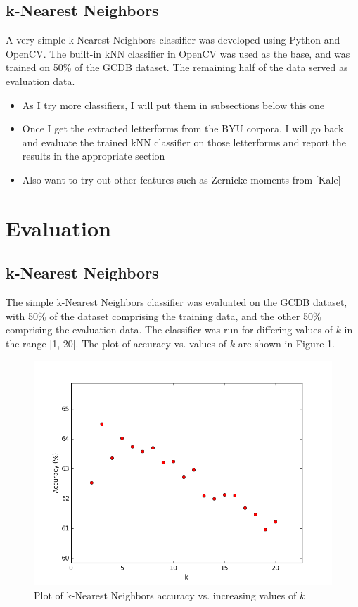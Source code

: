 \documentclass[10pt,twocolumn,letterpaper]{article}
\begin{document}
\subsection{k-Nearest Neighbors}

A very simple k-Nearest Neighbors classifier was developed using Python and OpenCV. The built-in kNN classifier in OpenCV was used as the base, and was trained on 50\% of the GCDB dataset. The remaining half of the data served as evaluation data.
\begin{itemize}
    \item As I try more classifiers, I will put them in subsections below this one
    \item Once I get the extracted letterforms from the BYU corpora, I will go back and evaluate the trained kNN classifier on those letterforms and report the results in the appropriate section
    \item Also want to try out other features such as Zernicke moments from [Kale]
\end{itemize}

\section{Evaluation}
\subsection{k-Nearest Neighbors}

The simple k-Nearest Neighbors classifier was evaluated on the GCDB dataset, with 50\% of the dataset comprising the training data, and the other 50\% comprising the evaluation data. The classifier was run for differing values of $k$ in the range [1, 20]. The plot of accuracy vs. values of $k$ are shown in Figure 1.

\begin{figure}
    \begin{center}
        \includegraphics[width=0.8\linewidth]{res/figure_1.png}
        \caption{Plot of k-Nearest Neighbors accuracy vs. increasing values of $k$}
    \end{center}
\end{figure}
\end{document}
